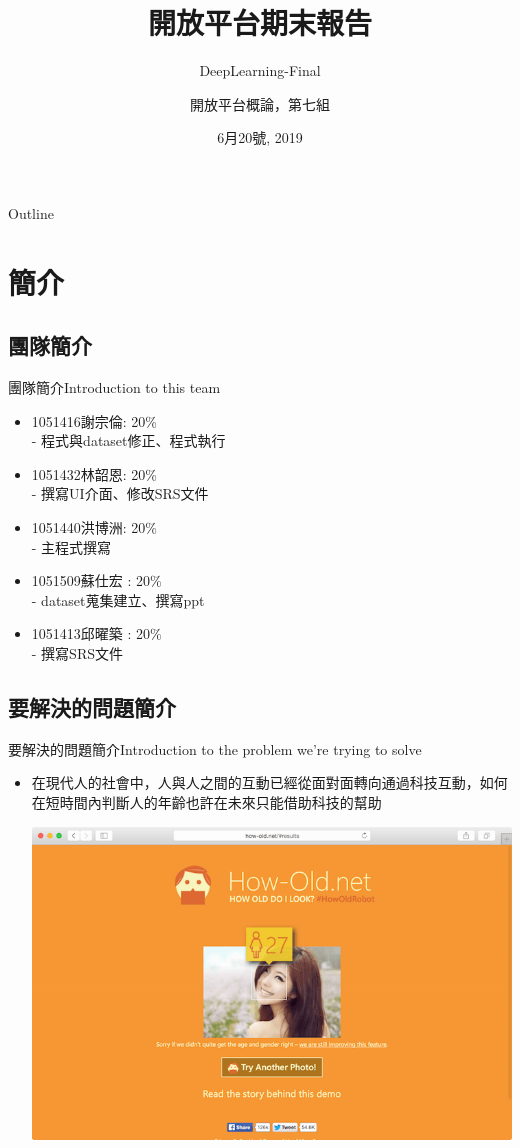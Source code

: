 \documentclass[utf8x]{beamer}
\title{開放平台期末報告}
\subtitle{DeepLearning-Final}
\author{開放平台概論，第七組}
\date{6月20號, 2019}
\begin{document}
\begin{frame}
  \titlepage
\end{frame}

\begin{frame}[shrink]{Outline}
  \tableofcontents
\end{frame}

\section{簡介}

\subsection{團隊簡介}

\begin{frame}{團隊簡介}{Introduction to this team }
  \begin{itemize}
  \item {
    1051416謝宗倫: 20\% \\
	 - 程式與dataset修正、程式執行
  }
  \item {
    1051432林韶恩: 20\% \\
	- 撰寫UI介面、修改SRS文件
  }
 \item {
    1051440洪博洲: 20\% \\
	- 主程式撰寫
  }
 \item {
    1051509蘇仕宏 : 20\% \\
	-  dataset蒐集建立、撰寫ppt
  }
 \item {
   1051413邱曜築 : 20\% \\
	 - 撰寫SRS文件
  }
  \end{itemize}
\end{frame}

\subsection{要解決的問題簡介}
\begin{frame}{要解決的問題簡介}{Introduction to the problem we're trying to solve}
  \begin{itemize}
  \item {
    在現代人的社會中，人與人之間的互動已經從面對面轉向通過科技互動，如何在短時間內判斷人的年齡也許在未來只能借助科技的幫助
\begin{minipage}[c][0.4\textheight][c]{\linewidth}
                \centering
                \includegraphics[width=0.5\linewidth]{how.png}
            \end{minipage}
  }
  \end{itemize}
\end{frame}
\end{document}
